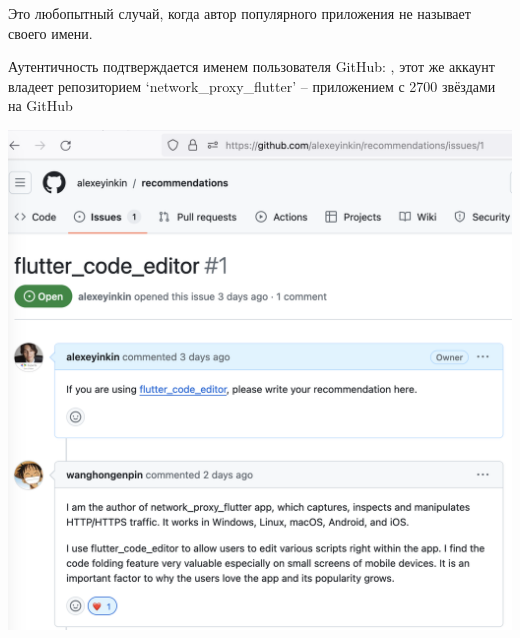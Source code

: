 
Это любопытный случай, когда автор популярного приложения
не называет своего имени.

Аутентичность подтверждается именем пользователя GitHub: ,
этот же аккаунт владеет репозиторием `network\_proxy\_flutter' --
приложением с 2700 звёздами на GitHub

\begin{center}
    \includegraphics[width=\textwidth]{network-proxy-flutter-recommendation}
\end{center}

\pagebreak
